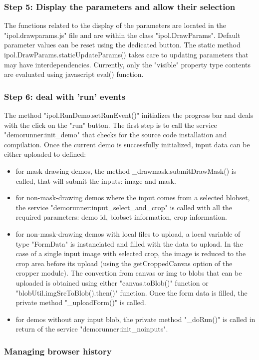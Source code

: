 \subsubsection{Step 5: Display the parameters and allow their selection}

The functions related to the display of the parameters are located in the "ipol.drawparams.js"
file and are within the class "ipol.DrawParams". Default parameter values can be reset using
the dedicated button.
The static method ipol.DrawParams.staticUpdateParams() takes care to updating parameters
that may have interdependencies. Currently, only the "visible" property type contents are 
evaluated using javascript eval() function.

\subsubsection{Step 6: deal with 'run' events}

The method "ipol.RunDemo.setRunEvent()" initializes the progress bar and deals
with the click on the "run" button.
The first step is to call the service "demorunner:init\_demo" that checks for the
source code installation and compilation. Once the current demo is successfully
initialized, input data can be either uploaded to defined:
\begin{itemize}
 \item for mask drawing demos, the method \_drawmask.submitDrawMask() is called,
        that will submit the inputs: image and mask.
 \item for non-mask-drawing demos where the input comes from a selected blobset,
        the service "demorunner:input\_select\_and\_crop" is called with all the
        required parameters: demo id, blobset information, crop information.
 \item for non-mask-drawing demos with local files to upload, a local variable
        of type "FormData" is instanciated and filled with the data to upload.
        In the case of a single input image with selected crop, the image
        is reduced to the crop area before its upload (using the getCroppedCanvas
        option of the cropper module). The convertion from canvas or img to 
        blobs that can be uploaded is obtained using either "canvas.toBlob()"
        function or "blobUtil.imgSrcToBlob().then()" function. Once the 
        form data is filled, the private method "\_uploadForm()" is called.
 \item for demos without any input blob, the private method "\_doRun()" is
        called in return of the service "demorunner:init\_noinputs".
\end{itemize}


\subsubsection{Managing browser history}

